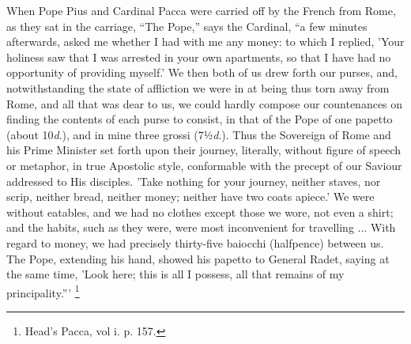 When Pope Pius and Cardinal Pacca were carried off by
the French from Rome, as they sat in the carriage,
``The Pope,'' says the Cardinal, ``a few
minutes afterwards, asked me whether I had with me any
money: to which I replied, 'Your holiness saw that I was
arrested in your own apartments, so that I have had no
opportunity of providing myself.' We then both of us drew
forth our purses, and, notwithstanding the state of
affliction we were in at being thus torn away from Rome,
and all that was dear to us, we could hardly compose our
countenances on finding the contents of each purse to
consist, in that of the Pope of one papetto (about 10\emph{d}.),
and in mine three grossi (7½\emph{d}.). Thus the
Sovereign of Rome and his Prime Minister set forth upon
their journey, literally, without figure of speech or
metaphor, in true Apostolic style, conformable with the
precept of our Saviour addressed to His disciples. 'Take
nothing for your journey, neither staves, nor scrip,
neither bread, neither money; neither have two coats
apiece.' We were without eatables, and we had no clothes
except those we wore, not even a shirt; and the habits,
such as they were, were most inconvenient for travelling
... With regard to money, we had precisely thirty-five
baiocchi (halfpence) between us. The Pope, extending his
hand, showed his papetto to General Radet, saying at the
same time, 'Look here; this is all I possess, all that
remains of my principality.''' \footnote{Head's Pacca, vol i. p. 157.}


